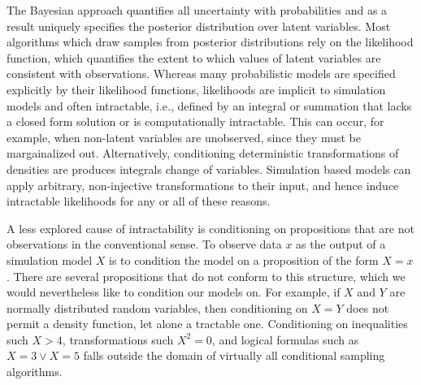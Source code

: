 The Bayesian approach quantifies all uncertainty with probabilities and as a result uniquely specifies the posterior distribution over latent variables.
Most algorithms which draw samples from posterior distributions rely on
the likelihood function, which quantifies the extent to which values of latent variables are consistent with observations.
Whereas many probabilistic models are specified explicitly by their likelihood functions, likelihoods are implicit to simulation models and often intractable, i.e., defined by an integral or summation that lacks a closed form solution or is computationally intractable.
This can occur, for example, when non-latent variables are unobserved, since they must be margainalized out.
Alternatively, conditioning deterministic transformations of densities are produces integrals change of variables.
Simulation based models can apply arbitrary, non-injective transformations to their input, and hence induce intractable likelihoods for any or all of these reasons.

A less explored cause of intractability is conditioning on propositions that are not observations in the conventional sense.
To observe data $x$ as the output of a simulation model $X$ is to condition the model on a proposition of the form $X = x$.
There are several propositions that do not conform to this structure, which we would nevertheless like to condition our models on.
For example, if $X$ and $Y$ are normally distributed random variables, then conditioning on $X = Y$ does not permit a density function, let alone a tractable one.
Conditioning on inequalities such $X > 4$, transformations such $X^2  = 0$, and logical formulas such as  $X = 3 \lor X = 5$ falls outside the domain of virtually all conditional sampling algorithms.

